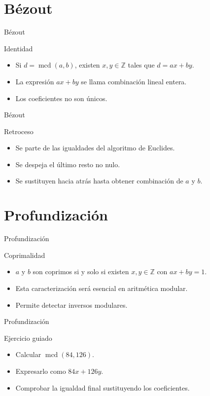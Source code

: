 \documentclass[aspectratio=169,11pt]{beamer}
\newcommand{\mcd}{\operatorname{mcd}}
\begin{document}
\section{Bézout}

\begin{frame}{Bézout}
\begin{block}{Identidad}
\begin{itemize}
  \item Si \(d=\mcd(a,b)\), existen \(x,y\in\mathbb{Z}\) tales que \(d=ax+by\).
  \item La expresión \(ax+by\) se llama combinación lineal entera.
  \item Los coeficientes no son únicos.
\end{itemize}
\end{block}
\end{frame}

\begin{frame}{Bézout}
\begin{block}{Retroceso}
\begin{itemize}
  \item Se parte de las igualdades del algoritmo de Euclides.
  \item Se despeja el último resto no nulo.
  \item Se sustituyen hacia atrás hasta obtener combinación de \(a\) y \(b\).
\end{itemize}
\end{block}
\end{frame}

\section{Profundización}

\begin{frame}{Profundización}
\begin{block}{Coprimalidad}
\begin{itemize}
  \item \(a\) y \(b\) son coprimos si y solo si existen \(x,y\in\mathbb{Z}\) con \(ax+by=1\).
  \item Esta caracterización será esencial en aritmética modular.
  \item Permite detectar inversos modulares.
\end{itemize}
\end{block}
\end{frame}

\begin{frame}{Profundización}
\begin{block}{Ejercicio guiado}
\begin{itemize}
  \item Calcular \(\mcd(84,126)\).
  \item Expresarlo como \(84x+126y\).
  \item Comprobar la igualdad final sustituyendo los coeficientes.
\end{itemize}
\end{block}
\end{frame}
\end{document}
